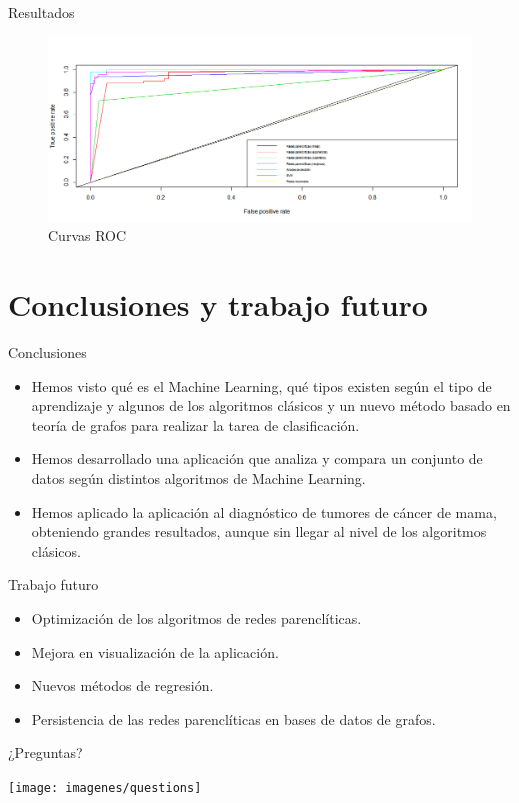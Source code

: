 \documentclass[hyperref={unicode}]{beamer}
\begin{document}
\begin{frame}{Resultados}
\begin{figure}
\begin{center}
			\includegraphics[width=\linewidth]{../memoria/imagenes/cancer/ROC_cancer.png}
		\end{center}
	\caption{Curvas ROC}
\end{figure}
\end{frame}

\section{Conclusiones y trabajo futuro}
\begin{frame}{Conclusiones}
	\begin{itemize}
	\item Hemos visto qué es el Machine Learning, qué tipos existen según el tipo de aprendizaje y algunos de los algoritmos clásicos y un nuevo método basado en teoría de grafos para realizar la tarea de clasificación. 
	
	\item Hemos desarrollado una aplicación que analiza y compara un conjunto de datos según distintos algoritmos de Machine Learning.
	
	\item Hemos aplicado la aplicación al diagnóstico de tumores de cáncer de mama, obteniendo grandes resultados, aunque sin llegar al nivel de los algoritmos clásicos.
	\end{itemize}
\end{frame}

\begin{frame}{Trabajo futuro}
	\begin{itemize}
		\item Optimización de los algoritmos de redes parenclíticas.
		 
		\item Mejora en visualización de la aplicación.
		
		\item Nuevos métodos de regresión.
		
		\item Persistencia de las redes parenclíticas en bases de datos de grafos.
	\end{itemize}
\end{frame}

\begin{frame}{¿Preguntas?}
	
	{%
		\centering
		\texttt{[image: imagenes/questions]}
	}


\end{frame}
\end{document}
